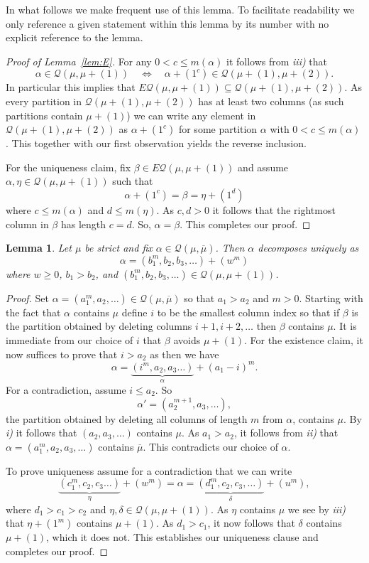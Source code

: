 \documentclass{article}
\theoremstyle{plain}
\newtheorem{lemma}[theorem]{Lemma}
\theoremstyle{definition}
\newcommand{\Q}{\mathcal{Q}}
\renewcommand{\ne}[1]{\overline{#1}}
\begin{document}
In what follows we make frequent use of this lemma.  To facilitate readability we only reference a given statement within this lemma by its number with no explicit reference to the lemma.  

\begin{proof}[Proof of Lemma~\ref{lem:E}]
For any $0<c\leq m(\alpha)$ it follows from \emph{iii)} that
$$\alpha\in \Q(\mu,\mu +(1))\quad \Longleftrightarrow\quad  \alpha +(1^c)\in \Q(\mu+(1),\mu+(2)).$$
In particular this implies that $E\Q(\mu,\mu+(1)) \subseteq \Q(\mu+(1),\mu+(2))$.  As every partition in $\Q(\mu+(1),\mu+(2))$ has at least two columns (as such partitions contain $\mu+(1)$) we can write any element in $\Q(\mu+(1),\mu+(2))$ as $\alpha+(1^c)$ for some partition $\alpha$ with $0<c\leq m(\alpha)$.  This together with our first observation yields the reverse inclusion.  

For the uniqueness claim, fix $\beta\in E\Q(\mu,\mu+(1))$ and assume $\alpha, \eta \in \Q(\mu,\mu+(1))$ such that 
$$\alpha +(1^c) = \beta = \eta +(1^d)$$
where $c\leq m(\alpha)$ and $d\leq m(\eta )$.   As $c,d>0$ it follows that the  rightmost column in $\beta$ has length $c=d$.  So, $\alpha = \beta$.  This completes our proof.
\end{proof}



\begin{lemma}\label{lem:Q(mu,nemu)}
	Let $\mu$ be strict and fix $\alpha \in \Q(\mu,\ne\mu)$.  Then $\alpha$ decomposes uniquely as 
$$\alpha = (b_1^m,b_2,b_3,\ldots) +(w^m)$$
where $w\geq 0$, $b_1>b_2$, and $(b_1^m,b_2,b_3,\ldots) \in \Q(\mu, \mu+(1))$.  
\end{lemma}
\begin{proof}
	Set $\alpha = (a_1^m, a_2,\ldots) \in \Q(\mu,\ne\mu)$ so that $a_1>a_2$ and $m>0$.  
Starting with the fact that $\alpha$ contains $\mu$ define $i$ to be the smallest column index so that if $\beta$ is the partition obtained by deleting columns $i+1,i+2,\ldots$ then $\beta$ contains $\mu$.  It is immediate from our choice of $i$ that $\beta$ avoids $\mu+(1)$.  For the existence claim, it now suffices to prove that $i>a_2$ as then we have 
$$\alpha = \underbrace{(i^m, a_2,a_3\ldots )}_{\alpha} + (a_1-i)^m.$$ 
For a contradiction, assume $i\leq a_2$.  So
$$\alpha' = (a_2^{m+1}, a_3,\ldots),$$
the partition obtained by deleting all columns of length $m$ from $\alpha$, contains $\mu$.  By \emph{i)} it follows that $(a_2, a_3,\ldots)$ contains $\mu$. As $a_1>a_2$, it follows from \emph{ii)} that $\alpha = (a_1^m,a_2,a_3,\ldots)$ contains $\ne\mu$.   This contradicts our choice of $\alpha$. 

To prove uniqueness assume for a contradiction that we can write 
$$\underbrace{(c_1^m, c_2,c_3 \ldots)}_\eta  + (w^m) = \alpha = \underbrace{(d_1^m, c_2, c_3, \ldots)}_\delta + (u^m),$$
where $d_1>c_1>c_2$ and $\eta ,\delta\in \Q(\mu,\mu+(1))$.  As $\eta $ contains $\mu$ we see by \emph{iii)} that $\eta +(1^m)$ contains $\mu+(1)$.  As $d_1>c_1$, it now follows that $\delta$ contains $\mu+(1)$, which it does not. This establishes our uniqueness clause and completes our proof.
\end{proof}
\end{document}
